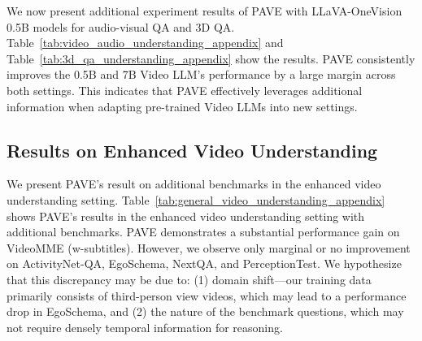We now present additional experiment results of PAVE with LLaVA-OneVision 0.5B models for audio-visual QA and 3D QA. 
Table~\ref{tab:video_audio_understanding_appendix} and Table~\ref{tab:3d_qa_understanding_appendix} show the results. PAVE consistently improves the 0.5B and 7B Video LLM's performance by a large margin across both settings. 
This indicates that PAVE effectively leverages additional information when adapting pre-trained Video LLMs into new settings. 

\subsection{Results on Enhanced Video Understanding} 

We present PAVE's result on additional benchmarks in the enhanced video understanding setting. 
Table~\ref{tab:general_video_understanding_appendix} shows PAVE's results in the enhanced video understanding setting with additional benchmarks. PAVE demonstrates a substantial performance gain on VideoMME (w-subtitles). However, we observe only marginal or no improvement on ActivityNet-QA, EgoSchema, NextQA, and PerceptionTest. We hypothesize that this discrepancy may be due to: (1) domain shift—our training data primarily consists of third-person view videos, which may lead to a performance drop in EgoSchema, and (2) the nature of the benchmark questions, which may not require densely temporal information for reasoning.





